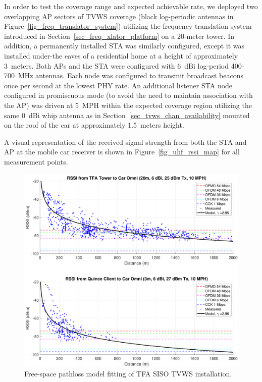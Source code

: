	In order to test the coverage range and expected achievable rate, we deployed two overlapping \ac{AP} sectors of \ac{TVWS} coverage (black log-periodic antennas in Figure~\ref{fig_freq_translator_system}) utilizing the frequency-translation system introduced in Section~\ref{sec_freq_xlator_platform} on a 20-meter tower.
	In addition, a permanently installed \ac{STA} was similarly configured, except it was installed under-the eaves of a residential home at a height of approximately 3~meters.
	Both \acp{AP} and the \ac{STA} were configured with 6~dBi log-period 400-700~MHz antennas.
	Each node was configured to transmit broadcast beacons once per second at the lowest \ac{PHY} rate.
	An additional listener \ac{STA} node configured in promiscuous mode (to avoid the need to maintain association with the \ac{AP}) was driven at 5~MPH within the expected coverage region utilizing the same 0~dBi whip antenna as in Section~\ref{sec_tvws_chan_availability} mounted on the roof of the car at approximately 1.5~meters height.

	A visual representation of the received signal strength from both the \ac{STA} and \ac{AP} at the mobile car receiver is shown in Figure~\ref{fig_uhf_rssi_map} for all measurement points.

\begin{figure}[p]
\centering
  	\includegraphics[width=1\linewidth]{figs/wardrive/TFA_Wardrive_Pathloss}   
   	\caption{Free-space pathloss model fitting of TFA \ac{SISO} \ac{TVWS} installation.
	\label{fig_uhf_siso_fspl}}
\end{figure}

